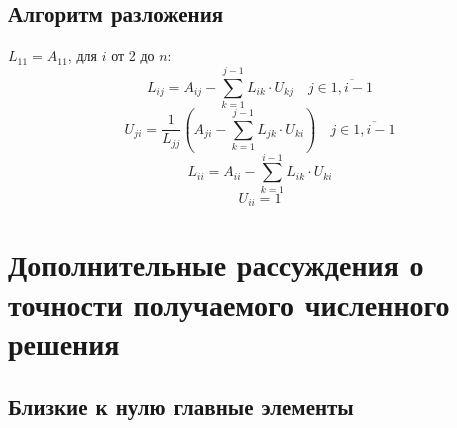 \subsection{Алгоритм разложения}
\(L_{11} = A_{11}\), для \(i\) от 2 до \(n\):
\begin{equation}
    L_{ij} = A_{ij} - \sum_{k = 1}^{j - 1} L_{ik} \cdot U_{kj} \quad j \in \overline{1, i - 1}
    \label{Lij}
\end{equation}
\begin{equation}
    U_{ji} = \frac{1}{L_{jj}} \left( A_{ji} - \sum_{k = 1}^{j - 1} L_{jk} \cdot U_{ki}\right) \quad j \in \overline{1, i - 1}
    \label{Uij}
\end{equation}
\begin{equation}
    L_{ii} = A_{ii} - \sum_{k = 1}^{i - 1} L_{ik} \cdot U_{ki}
    \label{Lii}
\end{equation}
\begin{equation}
    U_{ii} = 1
    \label{Uii}
\end{equation}

\section{Дополнительные рассуждения о точности получаемого численного решения}

\subsection{Близкие к нулю главные элементы}

